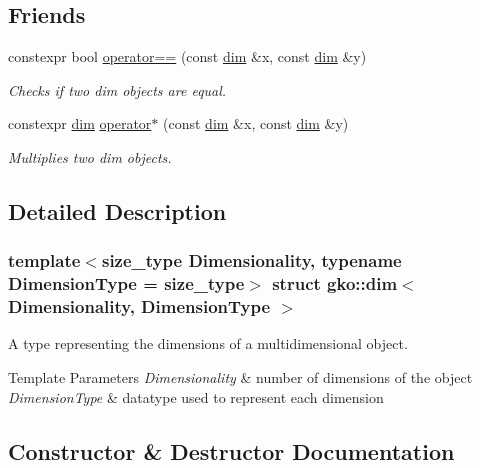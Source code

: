 \subsection*{Friends}
\begin{DoxyCompactItemize}
\item 
constexpr bool \hyperlink{structgko_1_1dim_a5e2c1e99f1c12540aac8489127c5dfb6}{operator==} (const \hyperlink{structgko_1_1dim}{dim} \&x, const \hyperlink{structgko_1_1dim}{dim} \&y)
\begin{DoxyCompactList}\small\item\em Checks if two dim objects are equal. \end{DoxyCompactList}\item 
constexpr \hyperlink{structgko_1_1dim}{dim} \hyperlink{structgko_1_1dim_a27d25e410396817b4ceafbae3d5df5c8}{operator$\ast$} (const \hyperlink{structgko_1_1dim}{dim} \&x, const \hyperlink{structgko_1_1dim}{dim} \&y)
\begin{DoxyCompactList}\small\item\em Multiplies two dim objects. \end{DoxyCompactList}\end{DoxyCompactItemize}


\subsection{Detailed Description}
\subsubsection*{template$<$size\+\_\+type Dimensionality, typename Dimension\+Type = size\+\_\+type$>$\newline
struct gko\+::dim$<$ Dimensionality, Dimension\+Type $>$}

A type representing the dimensions of a multidimensional object. 


\begin{DoxyTemplParams}{Template Parameters}
{\em Dimensionality} & number of dimensions of the object \\
\hline
{\em Dimension\+Type} & datatype used to represent each dimension \\
\hline
\end{DoxyTemplParams}


\subsection{Constructor \& Destructor Documentation}
\mbox{\label{structgko_1_1dim_a72c243d90a8aaed7d51b4d2547cba83d}} 
